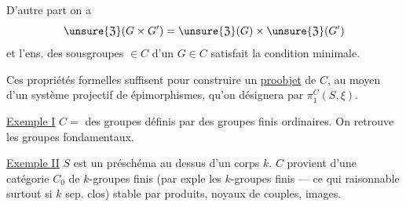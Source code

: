 
D'autre part on a
\[
\unsure{\mathfrak{Z}}(G\times G')=
\unsure{\mathfrak{Z}}(G)\times\unsure{\mathfrak{Z}}(G')
\]
et l'ens. des sousgroupes $\in C$ d'un $G\in C$ satisfait la condition minimale.

Ces propriétés formelles suffisent pour construire un \uline{proobjet} de $C$,
au moyen d'un système projectif de épimorphismes, qu'on
 désignera par $\pi_1^C(S,\xi)$.

\uline{Exemple I} $C=$  des groupes définis par des
groupes finis ordinaires. On retrouve les groupes fondamentaux.

\uline{Exemple II} $S$ est un préschéma au dessus d'un corps $k$.
$C$ provient d'une catégorie $C_0$ de $k$-groupes finis
(par exple  les $k$-groupes finis --- ce qui
raisonnable surtout si $k$ sep. clos)
stable par produits, noyaux de couples, images.
